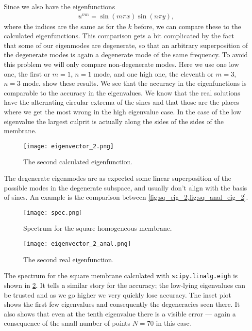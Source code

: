 \documentclass[10pt,a4paper,twocolumn]{article}
\begin{document}
Since we also have the eigenfunctions
%
\begin{align}
    u^{mn} = \sin (m \pi x) \sin (n \pi y),
\end{align}
%
where the indices are the same as for the $k$ before, we can compare these to the calculated eigenfunctions. This comparison gets a bit complicated by the fact that some of our eigenmodes are degenerate, so that an arbitrary superposition of the degenerate modes is again a degenerate mode of the same frequency. To avoid this problem we will only compare non-degenerate modes. Here we use one low one, the first or $m=1$, $n=1$ mode, and one high one, the eleventh or $m=3$, $n=3$ mode.  show these results. We see that the accuracy in the eigenfunctions is comparable to the accuracy in the eigenvalues. We know that the real solutions have the alternating circular extrema of the sines and that those are the places where we get the most wrong in the high eigenvalue case. In the case of the low eigenvalue the largest culprit is actually along the sides of the sides of the membrane.

\begin{figure}[!ht]
    \centering
    \texttt{[image: eigenvector\_2.png]}
    \caption{The second calculated eigenfunction.}
    \label{fig:sq_eig_2}
\end{figure}

The degenerate eigenmodes are as expected some linear superposition of the possible modes in the degenerate subspace, and usually don't align with the basis of sines. An example is the comparison between \cref{fig:sq_eig_2,fig:sq_anal_eig_2}. 

\begin{figure}[!b]
    \centering
    \texttt{[image: spec.png]}
    \caption{Spectrum for the square homogeneous membrane.}
    \label{fig:sq_spec}
\end{figure}

\begin{figure}[!ht]
    \centering
    \texttt{[image: eigenvector\_2\_anal.png]}
    \caption{The second real eigenfunction.}
    \label{fig:sq_anal_eig_2}
\end{figure}

The spectrum for the square membrane calculated with \texttt{scipy.linalg.eigh} is shown in \cref{fig:sq_spec}. It tells a similar story for the accuracy; the low-lying eigenvalues can be trusted and as we go higher we very quickly lose accuracy. The inset plot shows the first few eigenvalues and consequently the degeneracies seen there. It also shows that even at the tenth eigenvalue there is a visible error --- again a consequence of the small number of points $N=70$ in this case.
\end{document}
